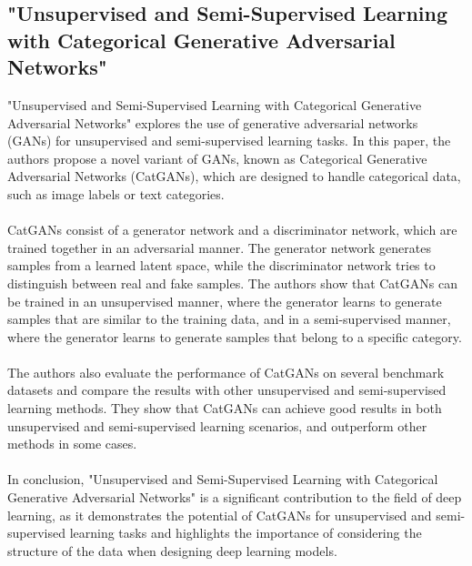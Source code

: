 \documentclass[paper=a4, fontsize=11pt]{scrartcl}
\numberwithin{equation}{section}		%
\numberwithin{figure}{section}			%
\numberwithin{table}{section}				%
\begin{document}
\subsection{"Unsupervised and Semi-Supervised Learning with Categorical Generative Adversarial Networks" \cite{Unsupervised and semi-supervised learning with categorical generative adversarial networks}}
"Unsupervised and Semi-Supervised Learning with Categorical Generative Adversarial Networks" explores the use of generative adversarial networks (GANs) for unsupervised and semi-supervised learning tasks. In this paper, the authors propose a novel variant of GANs, known as Categorical Generative Adversarial Networks (CatGANs), which are designed to handle categorical data, such as image labels or text categories.
\\
\\
CatGANs consist of a generator network and a discriminator network, which are trained together in an adversarial manner. The generator network generates samples from a learned latent space, while the discriminator network tries to distinguish between real and fake samples. The authors show that CatGANs can be trained in an unsupervised manner, where the generator learns to generate samples that are similar to the training data, and in a semi-supervised manner, where the generator learns to generate samples that belong to a specific category.
\\
\\
The authors also evaluate the performance of CatGANs on several benchmark datasets and compare the results with other unsupervised and semi-supervised learning methods. They show that CatGANs can achieve good results in both unsupervised and semi-supervised learning scenarios, and outperform other methods in some cases.
\\
\\
In conclusion, "Unsupervised and Semi-Supervised Learning with Categorical Generative Adversarial Networks" is a significant contribution to the field of deep learning, as it demonstrates the potential of CatGANs for unsupervised and semi-supervised learning tasks and highlights the importance of considering the structure of the data when designing deep learning models.
\end{document}
